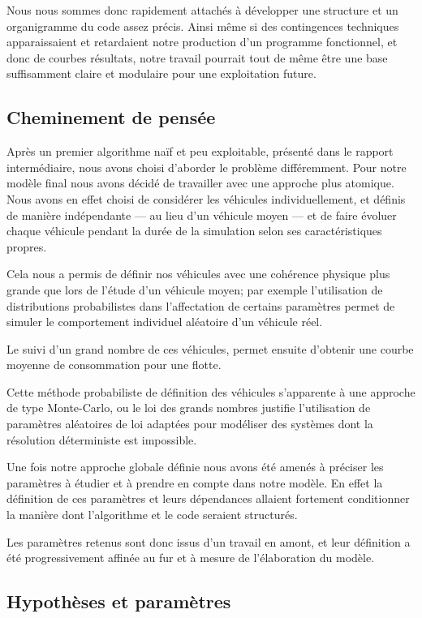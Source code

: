 			Nous nous sommes donc rapidement attachés à développer une structure et un organigramme du code assez précis. Ainsi même si des contingences techniques apparaissaient et retardaient notre production d'un programme fonctionnel, et donc de courbes résultats, notre travail pourrait tout de même être une base suffisamment claire et modulaire pour une exploitation future.

	\subsection{Cheminement de pensée}
	
		Après un premier algorithme naïf et peu exploitable, présenté dans le rapport intermédiaire, nous avons choisi d'aborder le problème différemment.
		Pour notre modèle final nous avons décidé de travailler avec une approche plus atomique. Nous avons en effet choisi de considérer les véhicules individuellement, et définis de manière indépendante ---  au lieu d'un véhicule moyen ---  et de faire évoluer chaque véhicule pendant la durée de la simulation selon ses caractéristiques propres.
		
		Cela nous a permis de définir nos véhicules avec une cohérence physique plus grande que lors de l'étude d'un véhicule moyen; par exemple l'utilisation de distributions probabilistes dans l'affectation de certains paramètres permet de simuler le comportement individuel aléatoire d'un véhicule réel.

		Le suivi d'un grand nombre de ces véhicules, permet ensuite d'obtenir une courbe moyenne de consommation pour une flotte.
		
		Cette méthode probabiliste de définition des véhicules s'apparente à une approche de type Monte-Carlo, ou le loi des grands nombres justifie l'utilisation de paramètres aléatoires de loi adaptées pour modéliser des systèmes dont la résolution déterministe est impossible.
		
		Une fois notre approche globale définie nous avons été amenés à préciser les paramètres à étudier et à prendre en compte dans notre modèle. En effet la définition de ces paramètres et leurs dépendances allaient fortement conditionner la manière dont l'algorithme et le code seraient structurés.

		Les paramètres retenus sont donc issus d'un travail en amont, et leur définition a été progressivement affinée au fur et à mesure de l'élaboration du modèle. 

	\subsection{Hypothèses et paramètres}
		
